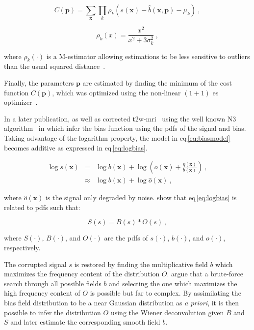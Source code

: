 \begin{equation}
	C(\mathbf{p}) = \sum_{\mathbf{x}} \prod_{k} \rho_k(s(\mathbf{x}) - \hat{b}(\mathbf{x},\mathbf{p}) - \mu_k) \ ,
	\label{eq:costbias}
\end{equation}

\begin{equation}
	\rho_k(x) = \frac{x^2}{x^2 + 3 \sigma_k^2} \ ,
	\label{eq:mestbias}
\end{equation}

\noindent where $\rho_k(\cdot)$ is a M-estimator allowing estimations to be less sensitive to outliers than the usual squared distance~\cite{Li1996}.

Finally, the parameters $\mathbf{p}$ are estimated by finding the minimum of the cost function $C(\mathbf{p})$, which was optimized using the non-linear $(1+1)$ \ac{es} optimizer~\cite{Styner1997}.

In a later publication, \citeauthor{Viswanath2012} as well as \citeauthor{giannini2015fully} corrected \ac{t2w}-\ac{mri}~\cite{Viswanath2012,giannini2015fully} using the well known N3 algorithm~\cite{Sled1998} in which \citeauthor{Sled1998} infer the bias function using the \acp{pdf} of the signal and bias.
Taking advantage of the logarithm property, the model in \acs{eq}\,\eqref{eq:biasmodel} becomes additive as expressed in \acs{eq}\,\eqref{eq:logbias}.

\begin{eqnarray}
	\log s(\mathbf{x}) & = & \log b(\mathbf{x}) + \log \left( o(\mathbf{x}) + \frac{\eta(\mathbf{x})}{b(\mathbf{x})} \right) \ , \nonumber \\
	& \approx & \log b(\mathbf{x}) + \log \hat{o}(\mathbf{x}) \ , \label{eq:logbias}
\end{eqnarray}

\noindent where $\hat{o}(\mathbf{x})$ is the signal only degraded by noise. \citeauthor{Sled1998} show that \acs{eq}\,\eqref{eq:logbias} is related to \acp{pdf} such that:

\begin{equation}
	S(s) = B(s) * O(s) \ ,
	\label{eq:distrbias} 
\end{equation}

\noindent where $S(\cdot)$, $B(\cdot)$, and $O(\cdot)$ are the \acp{pdf} of $s(\cdot)$, $b(\cdot)$, and $o(\cdot)$, respectively.

The corrupted signal $s$ is restored by finding the multiplicative field $b$ which maximizes the frequency content of the distribution $O$.
\citeauthor{Sled1998} argue that a brute-force search through all possible fields $b$ and selecting the one which maximizes the high frequency content of $O$ is possible but far to complex.
By assimilating the bias field distribution to be a near Gaussian distribution as \textit{a priori}, it is then possible to infer the distribution $O$ using the Wiener deconvolution given $B$ and $S$ and later estimate the corresponding smooth field $b$.

